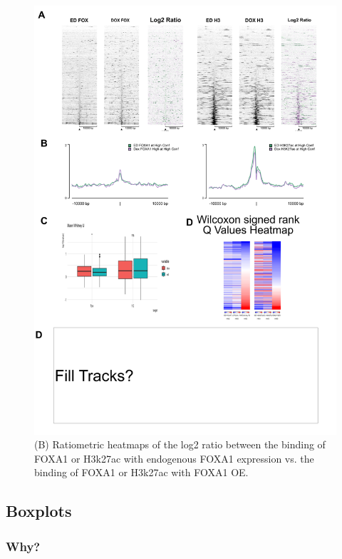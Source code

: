 \documentclass[
  12pt,
]{article}
\begin{document}
\begin{figure}[H]

{\centering \includegraphics[width=1\linewidth]{../images/results-01} 

}

\caption{(B) Ratiometric heatmaps of the log2 ratio between the binding of FOXA1 or H3k27ac with endogenous FOXA1 expression vs. the binding of FOXA1 or H3k27ac with FOXA1 OE.}\label{fig:results-1}
\end{figure}

\hypertarget{boxplots}{%
\subsection{Boxplots}\label{boxplots}}

\hypertarget{why}{%
\subsubsection{Why?}\label{why}}
\end{document}
